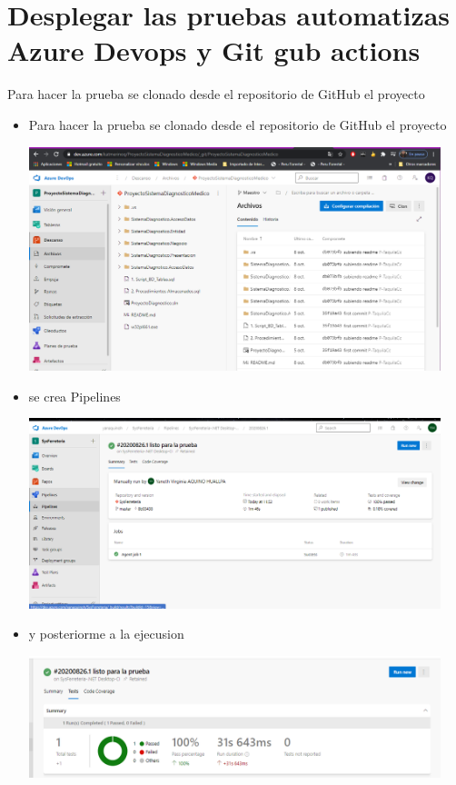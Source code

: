 \documentclass[preprint,12pt]{elsarticle}
\begin{document}
\section{Desplegar las pruebas automatizas  Azure Devops y Git gub actions }
Para hacer la prueba se clonado desde el repositorio de GitHub el proyecto
\begin{itemize} 
    \item Para hacer la prueba se clonado desde el repositorio de GitHub el proyecto
	\begin{center}
	\includegraphics[width=12cm]{./imagen/20} 
	\end{center}
	\item se crea Pipelines
	\begin{center}
	\includegraphics[width=12cm]{./imagen/21} 
	\end{center}
	\item y posteriorme a la ejecusion
	\begin{center}
	\includegraphics[width=12cm]{./imagen/22} 
	\end{center}
\end{itemize}
	\newpage
	
		
\end{document}
